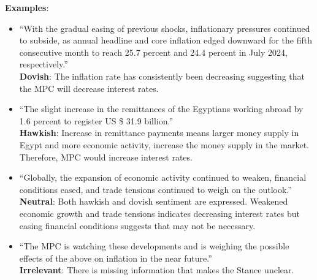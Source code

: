 \textbf{Examples}: 
\begin{itemize}
    \item ``With the gradual easing of previous shocks, inflationary pressures continued to subside, as annual headline and core inflation edged downward for the fifth consecutive month to reach 25.7 percent and 24.4 percent in July 2024, respectively.''\\
    \textbf{Dovish}: The inflation rate has consistently been decreasing suggesting that the MPC will decrease interest rates. 
    \item ``The slight increase in the remittances of the Egyptians working abroad by 1.6 percent to register US \$ 31.9 billion.''\\
    \textbf{Hawkish}: Increase in remittance payments means larger money supply in Egypt and more economic activity, increase the money supply in the market. Therefore, MPC would increase interest rates. 
    \item ``Globally, the expansion of economic activity continued to weaken, financial conditions eased, and trade tensions continued to weigh on the outlook.''\\
    \textbf{Neutral}: Both hawkish and dovish sentiment are expressed. Weakened economic growth and trade tensions indicates decreasing interest rates but easing financial conditions suggests that may not be necessary.
    \item ``The MPC is watching these developments and is weighing the possible effects of the above on inflation in the near future.''\\
    \textbf{Irrelevant}: There is missing information that makes the Stance unclear.
\end{itemize}

\newpage


